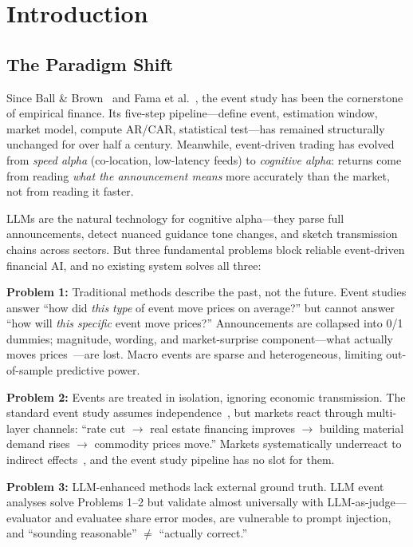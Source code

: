 \documentclass[sigconf, anonymous, review]{acmart}
\begin{document}
\maketitle

\section{Introduction}

\subsection{The Paradigm Shift}

Since Ball \& Brown~\cite{ball1968} and Fama et al.~\cite{fama1969}, the event study has been the cornerstone of empirical finance. Its five-step pipeline---define event, estimation window, market model, compute AR/CAR, statistical test---has remained structurally unchanged for over half a century. Meanwhile, event-driven trading has evolved from \emph{speed alpha} (co-location, low-latency feeds) to \emph{cognitive alpha}: returns come from reading \emph{what the announcement means} more accurately than the market, not from reading it faster.

LLMs are the natural technology for cognitive alpha---they parse full announcements, detect nuanced guidance tone changes, and sketch transmission chains across sectors. But three fundamental problems block reliable event-driven financial AI, and no existing system solves all three:

\textbf{Problem 1:} Traditional methods describe the past, not the future. Event studies answer ``how did \emph{this type} of event move prices on average?'' but cannot answer ``how will \emph{this specific} event move prices?'' Announcements are collapsed into 0/1 dummies; magnitude, wording, and market-surprise component---what actually moves prices~\cite{kuttner2001}---are lost. Macro events are sparse and heterogeneous, limiting out-of-sample predictive power.

\textbf{Problem 2:} Events are treated in isolation, ignoring economic transmission. The standard event study assumes independence~\cite{kolari2010}, but markets react through multi-layer channels: ``rate cut $\to$ real estate financing improves $\to$ building material demand rises $\to$ commodity prices move.'' Markets systematically underreact to indirect effects~\cite{cohen2008}, and the event study pipeline has no slot for them.

\textbf{Problem 3:} LLM-enhanced methods lack external ground truth. LLM event analyses solve Problems 1--2 but validate almost universally with LLM-as-judge---evaluator and evaluatee share error modes, are vulnerable to prompt injection, and ``sounding reasonable'' $\neq$ ``actually correct.''
\end{document}
